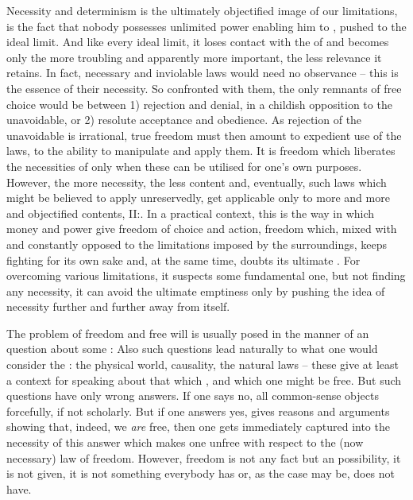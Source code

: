 %
Necessity and determinism is the ultimately objectified image of our
limitations, is the fact that nobody possesses unlimited power enabling him to
, pushed to the ideal limit. And like every ideal limit, it
loses contact with the  of  and becomes only the
more troubling and apparently more important, the less relevance it retains.  In
fact, necessary and inviolable laws would need no observance -- this is the
essence of their necessity. So confronted with them, the only remnants of free
choice would be between 1) rejection and denial, in a childish opposition to the
unavoidable, or 2) resolute acceptance and obedience. As rejection of the
unavoidable is irrational, true freedom must then amount to expedient use of the
laws, to the ability to manipulate and apply them.  It is freedom which
liberates  the necessities of  only when these can be
utilised for one's own purposes. However, the more necessity, the less content
and, eventually, such laws which might be believed to apply unreservedly, get
applicable only to more and more  and objectified contents,
II:. In a 
practical context, this is the way in which money and power give freedom of
choice and action, freedom which, mixed with and constantly opposed to the
limitations imposed by the surroundings, keeps fighting for its own sake and, at
the same time, doubts its ultimate .  For overcoming various 
 limitations, it suspects some fundamental one, but not finding any
 necessity, it can avoid the ultimate emptiness only by pushing the
idea of necessity further and further away from itself. 


\pa%
The problem of freedom and free will is usually posed in the manner of an
 question about some :   Also such questions lead naturally to what one
would consider the : the physical world, causality, the natural laws
-- these give at least a context for speaking about that which , and
 which one might be free.  But such questions have only wrong answers.
If one says no, all common-sense objects forcefully, if not scholarly.
But if one answers yes, gives reasons and arguments showing that, indeed, we
{\em are} free, then one gets immediately captured into the necessity of this
answer which makes one unfree with respect to the (now necessary) law of
freedom.  However, freedom is not any fact but an  possibility,
it is not given, it is not something everybody has or, as the case may be, does
not have.

